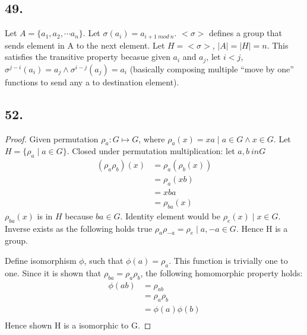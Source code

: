 \documentclass{article}
\begin{document}
\subsection*{49. }
Let $A = \{a_1, a_2, \cdots a_n\}$. Let $\sigma(a_i) = a_{i+1\ mod\ n}$.
$<\sigma>$ defines a group that sends element in A to the next element. Let $H =
<\sigma>$, $|A| = |H| = n$. This satisfies the transitive property becasue given
$a_i$ and $a_j$, let $i < j$, $\sigma^{j-i}(a_i) = a_j \wedge \sigma^{i-j}(a_j)
= a_i$ (basically composing multiple ``move by one'' functions to send any a to
destination element).

\subsection*{52. }
\begin{proof}Given permutation $\rho_a:G \mapsto G$, where $\rho_a(x) = xa \mid a \in G \wedge x
\in G$. Let $H = \{\rho_a \mid a \in G\}$. Closed under permutation
multiplication: let $a, b \ in G$
\begin{align*}
(\rho_a\rho_b)(x) &= \rho_a(\rho_b(x)) \\
									&= \rho_a(xb) \\
									&= xba \\
									&= \rho_{ba}(x)
\end{align*}
$\rho_{ba}(x)$ is in $H$ because $ba \in G$. Identity element would be
$\rho_e(x) \mid x \in G$. Inverse exists as the following holds true
$\rho_a\rho_{-a} = \rho_e \mid a,-a \in G$. Hence H is a group.

Define isomorphism $\phi$, such that $\phi(a) = \rho_a$. This function is
trivially one to one. Since it is shown that $\rho_{ba} = \rho_a\rho_b$, the
following homomorphic property holds:
\begin{align*}
	\phi(ab) &= \rho_{ab} \\
					 &= \rho_a\rho_b\\
					 &= \phi(a)\phi(b)\\
\end{align*}
Hence shown H is a isomorphic to G.
\end{proof}
\end{document}
